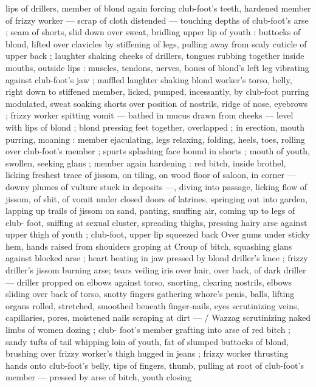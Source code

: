 {lips of drillers, member of blond again forcing club-foot's teeth, 
hardened member of frizzy worker --- scrap of cloth distended --- 
touching depths of club-foot's arse ; seam of shorts, slid down over 
sweat, bridling upper lip of youth : buttocks of blond, lifted over 
clavicles by stiffening of legs, pulling away from scaly cuticle of 
upper back ; laughter shaking cheeks of drillers, tongues rubbing 
together inside mouths, outside lips : muscles, tendons, nerves, 
bones of blond's left leg vibrating against club-foot's jaw ; muffled 
laughter shaking blond worker's torso, belly, right down to stiffened 
member, licked, pumped, incessantly, by club-foot purring 
modulated, sweat soaking shorts over position of nostrils, ridge of 
nose, eyebrows ; frizzy worker spitting vomit --- bathed in mucus 
drawn from cheeks --- level with lips of blond ; blond pressing feet 
together, overlapped ; in erection, mouth purring, moaning : member 
ejaculating, legs relaxing, folding, heels, toes, rolling over club-foot's 
member ; spurts splashing face bound in shorts ; mouth of youth, 
swollen, seeking glans ; member again hardening : red bitch, inside 
brothel, licking freshest trace of jissom, on tiling, on wood floor of 
saloon, in corner --- downy plumes of vulture stuck in deposits ---, 
diving into passage, licking flow of jissom, of shit, of vomit under 
closed doors of latrines, springing out into garden, lapping up trails 
of jissom on sand, panting, snuffing air, coming up to legs of club- 
foot, sniffing at sexual cluster, spreading thighs, pressing hairy arse 
against upper thigh of youth ; club-foot, upper lip squeezed back 
Over gums under sticky hem, hands raised from shoulders groping at 
Croup of bitch, squashing glans against blocked arse ; heart beating 
in jaw pressed by blond driller's knee ; frizzy driller's jissom burning 
arse; tears veiling iris over hair, over back, of dark driller --- driller 
propped on elbows against torso, snorting, clearing nostrils, elbows 
sliding over back of torso, snotty fingers gathering whore's penis, 
balls, lifting organs rolled, stretched, smoothed beneath finger-nails, 
eyes scrutinizing veins, capillaries, pores, moistened nails scraping 
at dirt --- {\slash} Wazzag scrutinizing naked limbs of women dozing ; club- 
foot's member grafting into arse of red bitch ; sandy tufts of tail 
whipping loin of youth, fat of slumped buttocks of blond, brushing 
over frizzy worker's thigh hugged in jeans ; frizzy worker thrusting 
hands onto club-foot's belly, tips of fingers, thumb, pulling at root of 
club-foot's member --- pressed by arse of bitch, youth closing 
}

